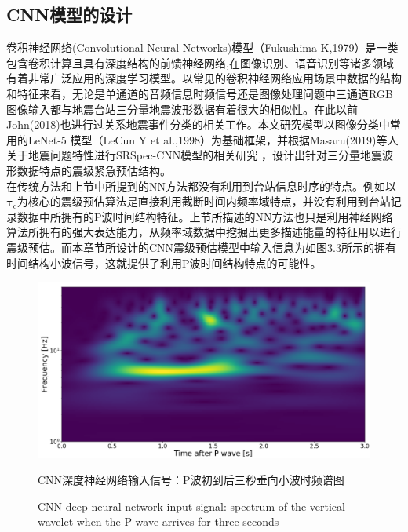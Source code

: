 \subsection{CNN模型的设计}
\indent 卷积神经网络(Convolutional Neural Networks)模型（Fukushima K,1979）是一类包含卷积计算且具有深度结构的前馈神经网络,在图像识别、语音识别等诸多领域有着非常广泛应用的深度学习模型。以常见的卷积神经网络应用场景中数据的结构和特征来看，无论是单通道的音频信息时频信号还是图像处理问题中三通道RGB图像输入都与地震台站三分量地震波形数据有着很大的相似性。在此以前John(2018)也进行过关系地震事件分类的相关工作。本文研究模型以图像分类中常用的LeNet-5 模型（LeCun Y et al.,1998）为基础框架，并根据Masaru(2019)等人关于地震问题特性进行SRSpec-CNN模型的相关研究 ，设计出针对三分量地震波形数据特点的震级紧急预估结构。\\
\indent 在传统方法和上节中所提到的NN方法都没有利用到台站信息时序的特点。例如以$\mathbf{\tau}_{\mathrm{c}}$为核心的震级预估算法是直接利用截断时间内频率域特点，并没有利用到台站记录数据中所拥有的P波时间结构特征。上节所描述的NN方法也只是利用神经网络算法所拥有的强大表达能力，从频率域数据中挖掘出更多描述能量的特征用以进行震级预估。而本章节所设计的CNN震级预估模型中输入信息为如图3.3所示的拥有时间结构小波信号，这就提供了利用P波时间结构特点的可能性。\\
\begin{figure}[h] 
\centering 
 \includegraphics[width=0.99\linewidth]{img/wavelet.jpg} 
 \renewcommand{\figurename}{图} 
\caption{CNN深度神经网络输入信号：P波初到后三秒垂向小波时频谱图} 
\addtocounter{figure}{-1} \vspace{-5pt} 
\renewcommand{\figurename}{Fig} 
\caption{CNN deep neural network input signal: spectrum of the vertical wavelet when the P wave arrives for three seconds} 
\renewcommand{\figurename}{图} 
\label{fig:network-device-influence.png} 
\end{figure}
